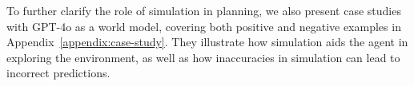 To further clarify the role of simulation in planning, we also present case studies with GPT-4o as a world model, covering both positive and negative examples in Appendix~\ref{appendix:case-study}.
They illustrate how simulation aids the agent in exploring the environment, as well as how inaccuracies in simulation can lead to incorrect predictions.


